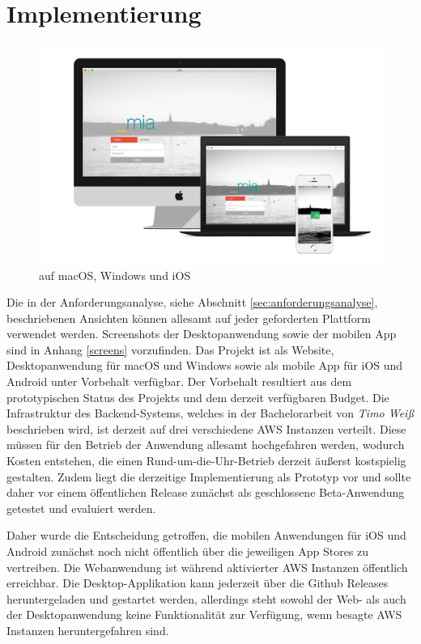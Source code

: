 \newpage

\section{Implementierung}

\begin{figure}[h]
 \centering
  \includegraphics[width=1\linewidth]{kapitel5/showcase.png}
 \caption{\projectname{} auf macOS, Windows und iOS}
 \label{kapitel5/cross}
\end{figure}
\vspace{0.3cm}

\noindent Die in der Anforderungsanalyse, siehe Abschnitt \ref{sec:anforderungsanalyse}, beschriebenen Ansichten können allesamt auf jeder geforderten Plattform verwendet werden.
Screenshots der Desktopanwendung sowie der mobilen App sind in Anhang \ref{screens} vorzufinden.
Das Projekt \projectname{} ist als Website, Desktopanwendung für macOS und Windows sowie als mobile App für iOS und Android unter Vorbehalt verfügbar.
Der Vorbehalt resultiert aus dem prototypischen Status des Projekts und dem derzeit verfügbaren Budget.
Die Infrastruktur des Backend-Systems, welches in der Bachelorarbeit von \emph{Timo Weiß} beschrieben wird,
ist derzeit auf drei verschiedene \ac{AWS} Instanzen verteilt. Diese müssen für den Betrieb der Anwendung allesamt
hochgefahren werden, wodurch Kosten entstehen, die einen Rund-um-die-Uhr-Betrieb derzeit äußerst kostspielig gestalten.
Zudem liegt die derzeitige Implementierung als Prototyp vor und sollte daher vor einem
öffentlichen Release zunächst als geschlossene Beta-Anwendung getestet und evaluiert werden.

Daher wurde die Entscheidung getroffen, die mobilen Anwendungen für iOS und Android zunächst noch nicht öffentlich über die jeweiligen App Stores zu vertreiben.
Die Webanwendung ist während aktivierter \ac{AWS} Instanzen öffentlich erreichbar.
Die Desktop-Applikation kann jederzeit über die Github Releases heruntergeladen und gestartet werden,
allerdings steht sowohl der Web- als auch der Desktopanwendung keine Funktionalität zur Verfügung, wenn besagte \ac{AWS}
Instanzen heruntergefahren sind.

